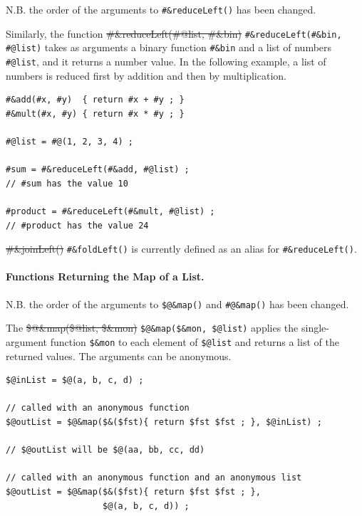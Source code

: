 \documentclass[letterpaper,12pt]{article}
\begin{document}
\begin{samepage}
\begin{changebar}

N.B. the order of the arguments to \verb!#&reduceLeft()! has been
changed.

Similarly, the function 
\sout{\#\&reduceLeft(\#@list, \#\&bin)}
\verb!#&reduceLeft(#&bin, #@list)! 
takes as arguments 
a binary function \verb!#&bin! and
a list of numbers \verb!#@list!,
and it returns a number value.  In
the following example, a list of numbers is reduced first by addition and then by
multiplication.

\end{changebar}
\end{samepage}

\begin{samepage}
\begin{changebar}

\begin{Verbatim}[fontsize=\small]
#&add(#x, #y)  { return #x + #y ; }
#&mult(#x, #y) { return #x * #y ; }

#@list = #@(1, 2, 3, 4) ;

#sum = #&reduceLeft(#&add, #@list) ;
// #sum has the value 10

#product = #&reduceLeft(#&mult, #@list) ;
// #product has the value 24
\end{Verbatim}

\noindent
\sout{\#\&joinLeft()} 
\verb!#&foldLeft()! 
is currently defined as an alias for \verb!#&reduceLeft()!.

\end{changebar}
\end{samepage}

\paragraph{Functions Returning the Map of a List.}

\begin{samepage}
\begin{changebar}

N.B. the order of the arguments to \verb!$@&map()! and \verb!#@&map()!
has been changed.

The \sout{\$@\&map(\$@list, \$\&mon)} \verb!$@&map($&mon, $@list)!
applies the single-argument function \verb!$&mon! to each element of
\verb!$@list! and returns a list of the returned values.  The arguments
can be anonymous.

\begin{Verbatim}[fontsize=\small]
$@inList = $@(a, b, c, d) ;

// called with an anonymous function
$@outList = $@&map($&($fst){ return $fst $fst ; }, $@inList) ;

// $@outList will be $@(aa, bb, cc, dd)

// called with an anonymous function and an anonymous list
$@outList = $@&map($&($fst){ return $fst $fst ; }, 
                   $@(a, b, c, d)) ;
\end{Verbatim}

\end{changebar}
\end{samepage}
\end{document}
